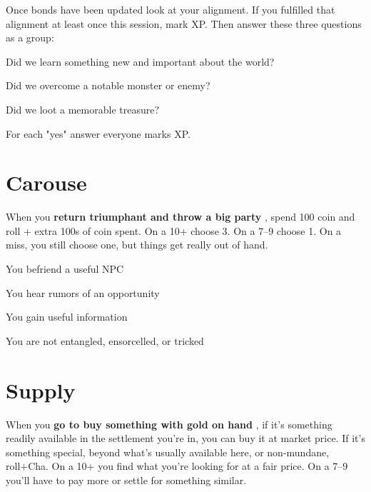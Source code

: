       

Once bonds have been updated look at your alignment. If you fulfilled that alignment at least once this session, mark XP. Then answer these three questions as a group:

       
\startitemize[1,packed]
         
\item Did we learn something new and important about the world?

         
\item Did we overcome a notable monster or enemy?

         
\item Did we loot a memorable treasure?

       
\stopitemize
       

For each "yes" answer everyone marks XP.

                 
\section{Carouse}   
       

When you {\bf return triumphant and throw a big party} , spend 100 coin and roll + extra 100s of coin spent. On a 10+ choose 3. On a 7–9 choose 1. On a miss, you still choose one, but things get really out of hand.

       
\startitemize[1,packed]
         
\item You befriend a useful NPC

         
\item You hear rumors of an opportunity

         
\item You gain useful information

         
\item You are not entangled, ensorcelled, or tricked

       
\stopitemize
       
\section{Supply}   
       

When you {\bf go to buy something with gold on hand} , if it's something readily available in the settlement you're in, you can buy it at market price. If it's something special, beyond what's usually available here, or non-mundane, roll+Cha. On a 10+ you find what you're looking for at a fair price. On a 7–9 you'll have to pay more or settle for something similar.

